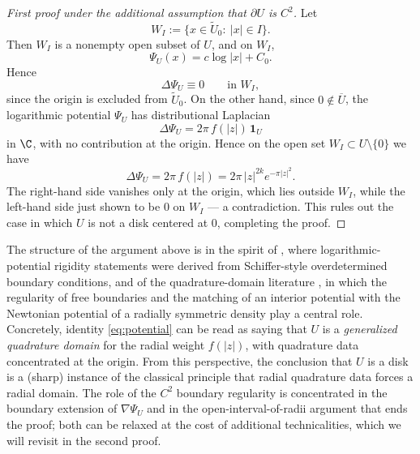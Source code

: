 \begin{proof}[First proof under the additional assumption that $\partial U$ is $C^2$]
Let
\[
W_I:=\{x\in \widetilde U_0:\ |x|\in I\}.
\]
Then \(W_I\) is a nonempty open subset of \(U\), and on \(W_I\),
\[
\Psi_U(x)=c\log|x|+C_0.
\]
Hence
\[
\Delta \Psi_U\equiv 0 \qquad \text{in } W_I,
\]
since the origin is excluded from $\widetilde U_0$. On the other hand,
since $0\notin \overline{U}$, the logarithmic potential $\Psi_U$ has
distributional Laplacian
\[
\Delta \Psi_U=2\pi\, f(|z|)\,\mathbf{1}_U
\]
in $\C$, with no contribution at the origin. Hence on the open set
$W_I\subset U\setminus\{0\}$ we have
\[
\Delta \Psi_U=2\pi\, f(|z|)=2\pi\, |z|^{2k}e^{-\pi |z|^2}.
\]
The right-hand side vanishes only at the origin, which lies outside
$W_I$, while the left-hand side just shown to be $0$ on $W_I$ — a
contradiction. This rules out the case in which $U$ is not a disk
centered at $0$, completing the proof.
\end{proof}

\begin{remark}
The structure of the argument above is in the spirit of
\cite{Aharonov-Schiffer-Zalcman}, where logarithmic-potential
rigidity statements were derived from Schiffer-style overdetermined
boundary conditions, and of the quadrature-domain literature
\cite{Gustafsson,Gustafsson-Shahgholian,Shahgholian,Karp}, in which
the regularity of free boundaries and the matching of an interior
potential with the Newtonian potential of a radially symmetric
density play a central role. Concretely, identity
\eqref{eq:potential} can be read as saying that $U$ is a
\emph{generalized quadrature domain} for the radial weight $f(|z|)$,
with quadrature data concentrated at the origin. From this perspective,
the conclusion that $U$ is a disk is a (sharp) instance of the
classical principle that radial quadrature data forces a radial
domain. The role of the $C^2$ boundary regularity is concentrated
in the boundary extension of $\nabla\Psi_U$ and in the
open-interval-of-radii argument that ends the proof; both can be
relaxed at the cost of additional technicalities, which we will
revisit in the second proof.
\end{remark}


